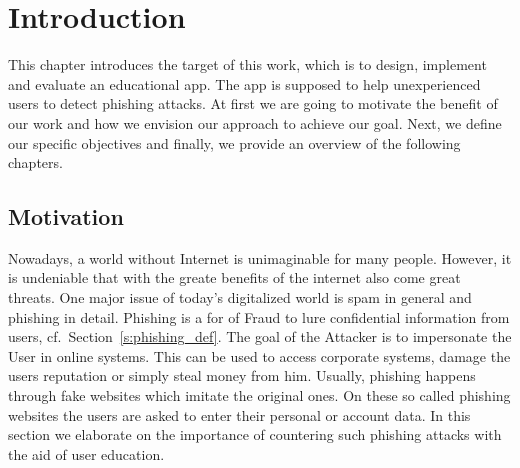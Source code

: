 \section{Introduction}
\label{s:introduction}
This chapter introduces the target of this work, which is to design, implement and evaluate an educational app. The app is supposed to help unexperienced users to detect phishing attacks. At first we are going to motivate the benefit of our work and how we envision our approach to achieve our goal. Next, we define our specific objectives and finally, we provide an overview of the following chapters.

\subsection{Motivation}
Nowadays, a world without Internet is unimaginable for many people. However, it is undeniable that with the greate benefits of the internet also come great threats. One major issue of today's digitalized world is spam in general and phishing in detail.
Phishing is a for of Fraud to lure confidential information from users, cf.~Section~\ref{s:phishing_def}. The goal of the Attacker is to impersonate the User in online systems. This can be used to access corporate systems, damage the users reputation or simply steal money from him. Usually, phishing happens through fake websites which imitate the original ones. On these so called phishing websites the users are asked to enter their personal or account data. In this section we elaborate on the importance of countering such phishing attacks with the aid of user education. 

